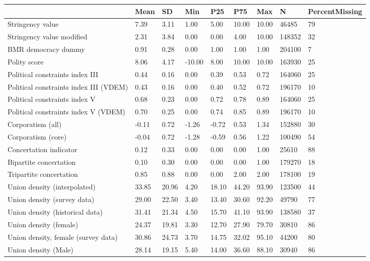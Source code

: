 
\begin{longtable}{lllllllll}
\toprule
  & Mean & SD & Min & P25 & P75 & Max & N & PercentMissing\\
\midrule
Stringency value & 7.39 & 3.11 & 1.00 & 5.00 & 10.00 & 10.00 & 46485 & 79\\
Stringency value modified & 2.31 & 3.84 & 0.00 & 0.00 & 4.00 & 10.00 & 148352 & 32\\
BMR democracy dummy & 0.91 & 0.28 & 0.00 & 1.00 & 1.00 & 1.00 & 204100 & 7\\
Polity score & 8.06 & 4.17 & -10.00 & 8.00 & 10.00 & 10.00 & 163930 & 25\\
Political constraints index III & 0.44 & 0.16 & 0.00 & 0.39 & 0.53 & 0.72 & 164060 & 25\\
\addlinespace
Political constraints index III (VDEM) & 0.43 & 0.16 & 0.00 & 0.40 & 0.52 & 0.72 & 196170 & 10\\
Political constraints index V & 0.68 & 0.23 & 0.00 & 0.72 & 0.78 & 0.89 & 164060 & 25\\
Political constraints index V (VDEM) & 0.70 & 0.25 & 0.00 & 0.74 & 0.85 & 0.89 & 196170 & 10\\
Corporatism (all) & -0.11 & 0.72 & -1.26 & -0.72 & 0.53 & 1.34 & 152880 & 30\\
Corporatism (core) & -0.04 & 0.72 & -1.28 & -0.59 & 0.56 & 1.22 & 100490 & 54\\
\addlinespace
Concertation indicator & 0.12 & 0.33 & 0.00 & 0.00 & 0.00 & 1.00 & 25610 & 88\\
Bipartite concertation & 0.10 & 0.30 & 0.00 & 0.00 & 0.00 & 1.00 & 179270 & 18\\
Tripartite concertation & 0.85 & 0.88 & 0.00 & 0.00 & 2.00 & 2.00 & 178100 & 19\\
Union density (interpolated) & 33.85 & 20.96 & 4.20 & 18.10 & 44.20 & 93.90 & 123500 & 44\\
Union density (survey data) & 29.00 & 22.50 & 3.40 & 13.40 & 30.60 & 92.20 & 49790 & 77\\
\addlinespace
Union density (historical data) & 31.41 & 21.34 & 4.50 & 15.70 & 41.10 & 93.90 & 138580 & 37\\
Union density (female) & 24.37 & 19.81 & 3.30 & 12.70 & 27.90 & 79.70 & 30810 & 86\\
Union density, female (survey data) & 30.86 & 24.73 & 3.70 & 14.75 & 32.02 & 95.10 & 44200 & 80\\
Union density (Male) & 28.14 & 19.15 & 5.40 & 14.00 & 36.60 & 88.10 & 30940 & 86\\

\end{longtable}
